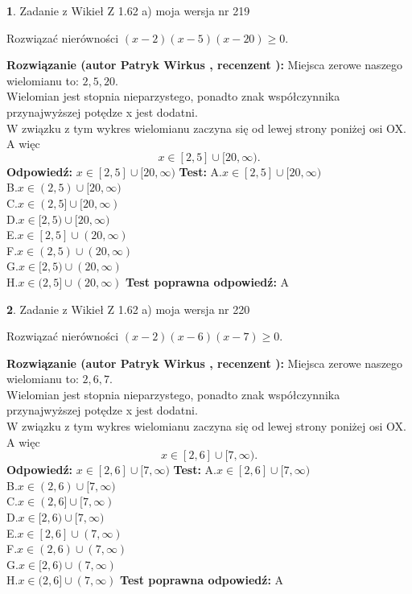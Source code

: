 \documentclass[12pt, a4paper]{article}
\theoremstyle{definition} %
\newtheorem{zad}{}
\newcommand{\zadStart}[1]{\begin{zad}#1\newline}
\newcommand{\zadStop}{\end{zad}}
\newcommand{\rozwStart}[2]{\noindent \textbf{Rozwiązanie (autor #1 , recenzent #2): }\newline}
\newcommand{\rozwStop}{\newline}
\newcommand{\odpStart}{\noindent \textbf{Odpowiedź:}\newline}
\newcommand{\odpStop}{\newline}
\newcommand{\testStart}{\noindent \textbf{Test:}\newline}
\newcommand{\testStop}{\newline}
\newcommand{\kluczStart}{\noindent \textbf{Test poprawna odpowiedź:}\newline}
\newcommand{\kluczStop}{\newline}
\begin{document}
\zadStart{Zadanie z Wikieł Z 1.62 a) moja wersja nr 219}

Rozwiązać nierówności $(x-2)(x-5)(x-20)\ge0$.
\zadStop
\rozwStart{Patryk Wirkus}{}
Miejsca zerowe naszego wielomianu to: $2, 5, 20$.\\
Wielomian jest stopnia nieparzystego, ponadto znak współczynnika przy\linebreak najwyższej potędze x jest dodatni.\\ W związku z tym wykres wielomianu zaczyna się od lewej strony poniżej osi OX. A więc $$x \in [2,5] \cup [20,\infty).$$
\rozwStop
\odpStart
$x \in [2,5] \cup [20,\infty)$
\odpStop
\testStart
A.$x \in [2,5] \cup [20,\infty)$\\
B.$x \in (2,5) \cup [20,\infty)$\\
C.$x \in (2,5] \cup [20,\infty)$\\
D.$x \in [2,5) \cup [20,\infty)$\\
E.$x \in [2,5] \cup (20,\infty)$\\
F.$x \in (2,5) \cup (20,\infty)$\\
G.$x \in [2,5) \cup (20,\infty)$\\
H.$x \in (2,5] \cup (20,\infty)$
\testStop
\kluczStart
A
\kluczStop



\zadStart{Zadanie z Wikieł Z 1.62 a) moja wersja nr 220}

Rozwiązać nierówności $(x-2)(x-6)(x-7)\ge0$.
\zadStop
\rozwStart{Patryk Wirkus}{}
Miejsca zerowe naszego wielomianu to: $2, 6, 7$.\\
Wielomian jest stopnia nieparzystego, ponadto znak współczynnika przy\linebreak najwyższej potędze x jest dodatni.\\ W związku z tym wykres wielomianu zaczyna się od lewej strony poniżej osi OX. A więc $$x \in [2,6] \cup [7,\infty).$$
\rozwStop
\odpStart
$x \in [2,6] \cup [7,\infty)$
\odpStop
\testStart
A.$x \in [2,6] \cup [7,\infty)$\\
B.$x \in (2,6) \cup [7,\infty)$\\
C.$x \in (2,6] \cup [7,\infty)$\\
D.$x \in [2,6) \cup [7,\infty)$\\
E.$x \in [2,6] \cup (7,\infty)$\\
F.$x \in (2,6) \cup (7,\infty)$\\
G.$x \in [2,6) \cup (7,\infty)$\\
H.$x \in (2,6] \cup (7,\infty)$
\testStop
\kluczStart
A
\kluczStop
\end{document}
